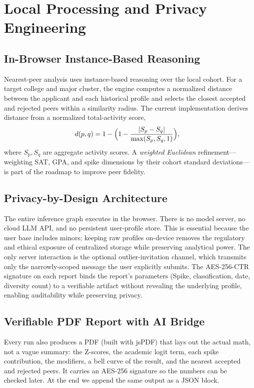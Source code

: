 \documentclass[conference]{IEEEtran}
\begin{document}
\section{Local Processing and Privacy Engineering}
\subsection{In-Browser Instance-Based Reasoning}
Nearest-peer analysis uses instance-based reasoning over the local cohort. For a target college and major cluster, the engine computes a normalized distance between the applicant and each historical profile and selects the closest accepted and rejected peers within a similarity radius. The current implementation derives distance from a normalized total-activity score,
\begin{equation}
d(p,q)=1-\Bigl(1-\frac{|S_p-S_q|}{\max(S_p,S_q,1)}\Bigr),
\end{equation}
where $S_p,S_q$ are aggregate activity scores. A \textit{weighted Euclidean} refinement---weighting SAT, GPA, and spike dimensions by their cohort standard deviations---is part of the roadmap to improve peer fidelity.

\subsection{Privacy-by-Design Architecture}
The entire inference graph executes in the browser. There is no model server, no cloud LLM API, and no persistent user-profile store. This is essential because the user base includes minors; keeping raw profiles on-device removes the regulatory and ethical exposure of centralized storage while preserving analytical power. The only server interaction is the optional outlier-invitation channel, which transmits only the narrowly-scoped message the user explicitly submits. The AES-256-CTR signature on each report binds the report's parameters (Spike, classification, date, diversity count) to a verifiable artifact without revealing the underlying profile, enabling auditability while preserving privacy.

\subsection{Verifiable PDF Report with AI Bridge}
Every run also produces a PDF (built with jsPDF) that lays out the actual math, not a vague summary: the Z-scores, the academic logit term, each spike contribution, the modifiers, a bell curve of the result, and the nearest accepted and rejected peers. It carries an AES-256 signature so the numbers can be checked later. At the end we append the same output as a JSON block.
\end{document}
